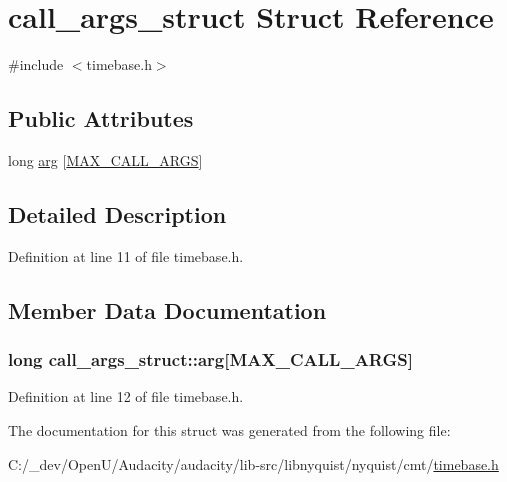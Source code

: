 \hypertarget{structcall__args__struct}{}\section{call\+\_\+args\+\_\+struct Struct Reference}
\label{structcall__args__struct}


{\ttfamily \#include $<$timebase.\+h$>$}

\subsection*{Public Attributes}
\begin{DoxyCompactItemize}
\item 
long \hyperlink{structcall__args__struct_a2ac55b9f613c100374ede57b06027256}{arg} \mbox{[}\hyperlink{timebase_8h_aea67202bb7db9b2ce54661256974abc0}{M\+A\+X\+\_\+\+C\+A\+L\+L\+\_\+\+A\+R\+GS}\mbox{]}
\end{DoxyCompactItemize}


\subsection{Detailed Description}


Definition at line 11 of file timebase.\+h.



\subsection{Member Data Documentation}
\subsubsection[{\texorpdfstring{arg}{arg}}]{\setlength{\rightskip}{0pt plus 5cm}long call\+\_\+args\+\_\+struct\+::arg\mbox{[}{\bf M\+A\+X\+\_\+\+C\+A\+L\+L\+\_\+\+A\+R\+GS}\mbox{]}}\hypertarget{structcall__args__struct_a2ac55b9f613c100374ede57b06027256}{}\label{structcall__args__struct_a2ac55b9f613c100374ede57b06027256}


Definition at line 12 of file timebase.\+h.



The documentation for this struct was generated from the following file\+:\begin{DoxyCompactItemize}
\item 
C\+:/\+\_\+dev/\+Open\+U/\+Audacity/audacity/lib-\/src/libnyquist/nyquist/cmt/\hyperlink{timebase_8h}{timebase.\+h}\end{DoxyCompactItemize}
